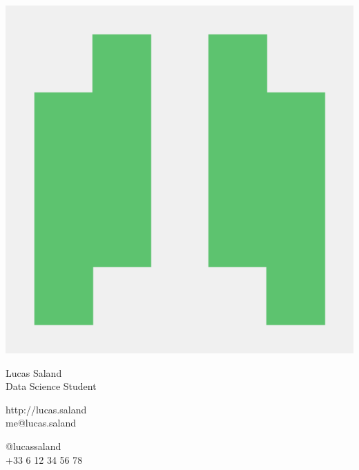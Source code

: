 \documentclass{article}
\begin{document}
\centering \includegraphics[width=.25\linewidth]{logo}\\[2pt]
\parbox{2in}{\Large \centering Lucas Saland\\[1pt]
\normalsize Data Science Student}

\vfill
\raggedright
\begin{multicols}{2}
http://lucas.saland\\
me@lucas.saland

\columnbreak
\raggedleft
@lucassaland\\
+33 6 12 34 56 78%
\end{multicols}%
\end{document}
